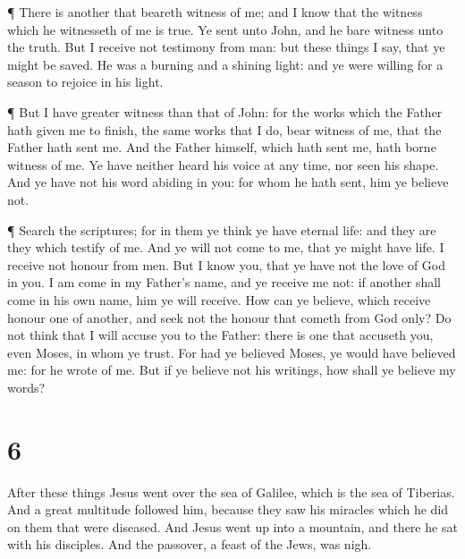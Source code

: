 ¶ There is another that beareth witness of me; and I know
that the witness which he witnesseth of me is true.  Ye
sent unto John, and he bare witness unto the truth.  But I
receive not testimony from man: but these things I say, that ye might be
saved.  He was a burning and a shining light: and ye were
willing for a season to rejoice in his light.

 ¶ But I have greater witness than that of John: for the
works which the Father hath given me to finish, the same works that I
do, bear witness of me, that the Father hath sent me.  And
the Father himself, which hath sent me, hath borne witness of me. Ye
have neither heard his voice at any time, nor seen his shape.
 And ye have not his word abiding in you: for whom he hath
sent, him ye believe not.

 ¶ Search the scriptures; for in them ye think ye have
eternal life: and they are they which testify of me.  And
ye will not come to me, that ye might have life.  I receive
not honour from men.  But I know you, that ye have not the
love of God in you.  I am come in my Father's name, and ye
receive me not: if another shall come in his own name, him ye will
receive.  How can ye believe, which receive honour one of
another, and seek not the honour that cometh from God only?
 Do not think that I will accuse you to the Father: there
is one that accuseth you, even Moses, in whom ye trust. 
For had ye believed Moses, ye would have believed me: for he wrote of
me.  But if ye believe not his writings, how shall ye
believe my words?

\hypertarget{section-5}{%
\section{6}\label{section-5}}

 After these things Jesus went over the sea of Galilee,
which is the sea of Tiberias.  And a great multitude
followed him, because they saw his miracles which he did on them that
were diseased.  And Jesus went up into a mountain, and there
he sat with his disciples.  And the passover, a feast of the
Jews, was nigh.

